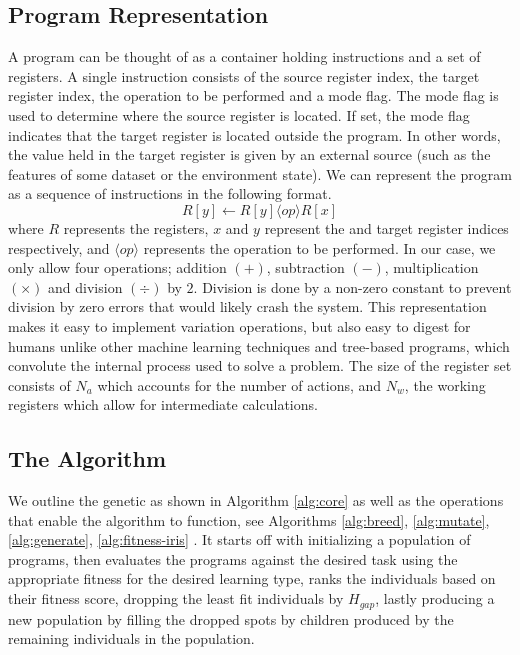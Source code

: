 \documentclass[12pt, final]{dalcsthesis}
\begin{document}
\subsection{Program Representation}
A program can be thought of as a container holding instructions and a set of registers. A single instruction consists of the source register index, the target register index, the operation to be performed and a mode flag. The mode flag is used to determine where the source register is located. If set, the mode flag indicates that the target register is located outside the program. In other words, the value held in the target register is given by an external source (such as the features of some dataset or the environment state). We can represent the program as a sequence of instructions in the following format. $$R[y] \leftarrow R[y] \langle op \rangle  R[x]$$ where $R$ represents the registers, $x$ and $y$ represent the and target register indices respectively, and $\langle op \rangle$ represents the operation to be performed. In our case, we only allow four operations; addition $(+)$,
subtraction $(-)$, multiplication $(\times)$ and division $(\div)$ by $2$. Division is done by a non-zero constant to prevent division by zero errors that would likely crash the system. This representation makes it easy to implement variation operations, but also easy to digest for humans unlike other machine learning techniques and tree-based programs, which convolute the internal process used to solve a problem. The size of the register set consists of $N_a$ which accounts for the number of actions, and $N_w$, the working registers which allow for intermediate calculations.

\subsection{The Algorithm}

We outline the genetic as shown in Algorithm \ref{alg:core}
as well as the operations that enable the algorithm to function, see Algorithms \ref{alg:breed}, \ref{alg:mutate}, \ref{alg:generate}, \ref{alg:fitness-iris} . It starts off with initializing a population of programs, then evaluates the programs against the desired task using the appropriate fitness for the desired learning type, ranks the individuals based on their fitness score,
dropping the least fit individuals by $H_{gap}$, lastly producing a new population by filling the
dropped spots by children produced by the remaining individuals in the population.
\end{document}
